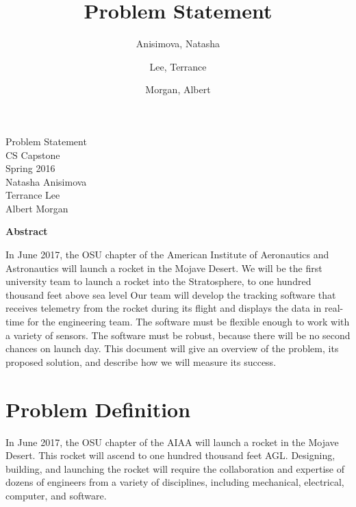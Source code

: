 \documentclass[10pt,journal,draftclsnofoot,onecolumn]{IEEEtran}
\begin{document}
	\singlespace
	
	\title{\vspace{2in}Problem Statement}
	
	\author {
		Anisimova, Natasha
		\and
		Lee, Terrance
		\and
		Morgan, Albert
	}
	
	
	\pagestyle{empty}
	\vspace*{2in}
	\begin{center}
		\huge
		Problem Statement\\
		\normalsize
		\vspace{5mm}
		CS Capstone\\
		Spring 2016\\
		\vspace{5mm}
		Natasha Anisimova\\
		Terrance Lee\\
		Albert Morgan
	\end{center}
	
	\vspace{5mm}
	
	\begin{center}
		\textbf{Abstract}
	\end{center}
	
	\begin{adjustwidth}{2in}{2in}
		In June 2017, the \ac{OSU} chapter of the
		American Institute of Aeronautics and Astronautics will launch a rocket in the Mojave Desert.
		We will be the first university team to launch a rocket into the Stratosphere, to one hundred thousand feet above sea level
		Our team will develop the tracking software that receives
		telemetry from the rocket during its flight
		and displays the data in real-time for the engineering team.
		The software must be flexible enough to work with a variety of sensors.
		The software must be robust,
		because there will be no second chances on launch day.
		This document will give an overview of the problem,
		its proposed solution,
		and describe how we will measure its success.
	\end{adjustwidth}
	
	\newpage
	\pagestyle{headings}
	\section{Problem Definition}
	In June 2017, the \ac{OSU} chapter of the
	\ac{AIAA} will launch a rocket in the Mojave Desert.
	This rocket will ascend to one hundred thousand feet \ac{AGL}.
	Designing, building, and launching the rocket will require the
	collaboration and expertise of dozens of engineers from a variety
	of disciplines, including mechanical, electrical, computer, and
	software.
	
\end{document}
